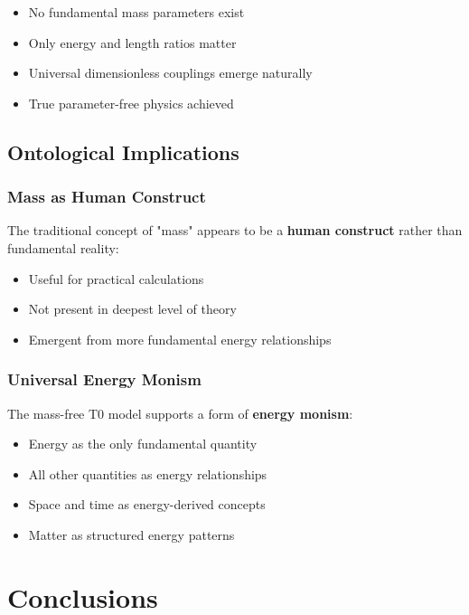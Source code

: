 \documentclass[12pt,a4paper]{article}
\begin{document}
	\begin{itemize}
		\item No fundamental mass parameters exist
		\item Only energy and length ratios matter
		\item Universal dimensionless couplings emerge naturally
		\item True parameter-free physics achieved
	\end{itemize}
	
	\subsection{Ontological Implications}
	\label{subsec:ontological}
	
	\subsubsection{Mass as Human Construct}
	
	The traditional concept of "mass" appears to be a \textbf{human construct} rather than fundamental reality:
	
	\begin{itemize}
		\item Useful for practical calculations
		\item Not present in deepest level of theory
		\item Emergent from more fundamental energy relationships
	\end{itemize}
	
	\subsubsection{Universal Energy Monism}
	
	The mass-free T0 model supports a form of \textbf{energy monism}:
	\begin{itemize}
		\item Energy as the only fundamental quantity
		\item All other quantities as energy relationships
		\item Space and time as energy-derived concepts
		\item Matter as structured energy patterns
	\end{itemize}
	
	\section{Conclusions}
	\label{sec:conclusions}
	
\end{document}
